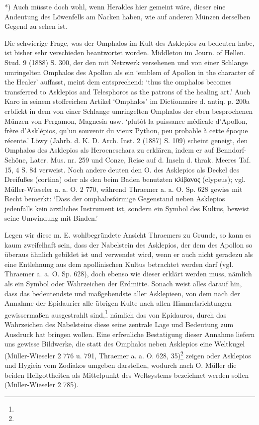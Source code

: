\documentclass[a4paper, 11pt, oneside]{article}
\begin{document}
*) Auch müsste doch wohl, wenn Herakles hier gemeint wäre, dieser eine Andeutung des Löwenfells am Nacken haben, wie auf anderen Münzen derselben Gegend zu sehen ist.

Die schwierige Frage, was der Omphalos im Kult des Asklepios zu bedeuten habe, ist bisher sehr verschieden beantwortet worden. Middleton im Journ. of Hellen. Stud. 9 (1888) S. 300, der den mit Netzwerk versehenen und von einer Schlange umringelten Omphalos des Apollon als ein `emblem of Apollon in the character of the Healer' auffasst, meint dem entsprechend: `thus the omphalos becomes transferred to Asklepios and Telesphoros as the patrons of the healing art.' Auch Karo in seinem stoffreichen Artikel `Omphalos' im Dictionnaire d. antiq. p. 200a erblickt in dem von einer Schlange umringelten Omphalos der eben besprochenen Münzen von Pergamon, Magnesia usw. `plutôt la puissance médicale d'Apollon, frère d'Asklépios, qu'un souvenir du vieux Python, peu probable à cette époque récente.' Löwy (Jahrb. d. K. D. Arch. Inst. 2 (1887) S. 109) scheint geneigt, den Omphalos des Asklepios als Heroeneschara zu erklären, indem er auf Benndorf-Schöne, Later. Mus. nr. 259 und Conze, Reise auf d. Inseln d. thrak. Meeres Taf. 15, 4 S. 84 verweist. Noch andere deuten den O. des Asklepios als Deckel des Dreifußes (cortina) oder als den beim Baden benutzten κλίβανος (clypeus); vgl. Müller-Wieseler a. a. O. 2 770, während Thraemer a. a. O. Sp. 628 gewiss mit Recht bemerkt: `Dass der omphalosförmige Gegenstand neben Asklepios jedenfalls kein ärztliches Instrument ist, sondern ein Symbol des Kultus, beweist seine Umwindung mit Binden.'

Legen wir diese m. E. wohlbegründete Ansicht Thraemers zu Grunde, so kann es kaum zweifelhaft sein, dass der Nabelstein des Asklepios, der dem des Apollon so überaus ähnlich gebildet ist und verwendet wird, wenn er auch nicht geradezu als eine Entlehnung aus dem apollinischen Kultus betrachtet werden darf (vgl. Thraemer a. a. O. Sp. 628), doch ebenso wie dieser erklärt werden muss, nämlich als ein Symbol oder Wahrzeichen der Erdmitte. Sonach weist alles darauf hin, dass das bedeutendste und maßgebendste aller Asklepieen, von dem nach der Annahme der Epidaurier alle übrigen Kulte nach allen Himmelsrichtungen gewissermaßen ausgestrahlt sind,\footnote{} nämlich das von Epidauros, durch das Wahrzeichen des Nabelsteins diese seine zentrale Lage und Bedeutung zum Ausdruck hat bringen wollen. Eine erfreuliche Bestatigung dieser Annahme liefern uns gewisse Bildwerke, die statt des Omphalos neben Asklepios eine Weltkugel (Müller-Wieseler 2 776 u. 791, Thraemer a. a. O. 628, 35)\footnote{} zeigen oder Asklepios und Hygieia vom Zodiakos umgeben darstellen, wodurch nach O. Müller die beiden Heilgottheiten als Mittelpunkt des Weltsystems bezeichnet werden sollen (Müller-Wieseler 2 785).
\end{document}
